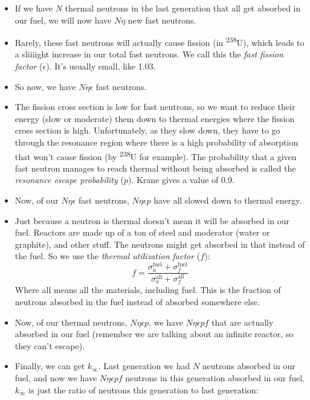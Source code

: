 \documentclass[letter]{article}
\begin{document}
\begin{itemize}
\item If we have $N$ thermal neutrons in the last generation that all get
  absorbed in our fuel, we will now have $N\eta$ new fast neutrons.
\item Rarely, these fast neutrons will actually cause fission (in
  \textsuperscript{238}U), which leads to a sliiiight increase in our
  total fast neutrons. We call this the \textit{fast fission factor}
  ($\epsilon$). It's usually small, like 1.03.~\cite[pp.502]{krane}
\item So now, we have $N\eta\epsilon$ fast neutrons.
\item The fission cross section is low for fast neutrons, so we want
  to reduce their energy (slow or moderate) them down to thermal
  energies where the fission cross section is high. Unfortunately, as
  they slow down, they have to go through the resonance region where
  there is a high probability of absorption that won't cause fission (by \textsuperscript{238}U
  for example). The probability that a
  given fast neutron manages to reach thermal without being absorbed
  is called the \textit{resonance escape probability}
  ($p$). Krane gives a value of 0.9.~\cite[pp. 503]{krane}
\item Now, of our $N\eta\epsilon$ fast neutrons, $N\eta\epsilon{}p$ have all slowed
  down to thermal energy.
\item Just because a neutron is thermal doesn't mean it will be
  absorbed in our fuel. Reactors are made up of a ton of steel and
  moderator (water or graphite), and other stuff. The neutrons might
  get absorbed in that instead of the fuel. So we use the
  \textit{thermal utilization factor} ($f$):
  \begin{equation*}
    f = \frac{\sigma_a^{\text{fuel}}+\sigma_f^{\text{fuel}}}{\sigma_a^{\text{all}}+\sigma_f^{\text{all}}}
  \end{equation*}
Where all means all the materials, including fuel. This is the
fraction of neutrons absorbed in the fuel instead of absorbed
somewhere else.~\cite[pp. 503]{krane}
\item Now, of our thermal neutrons, $N\eta\epsilon{}p$, we have
  $N\eta\epsilon{}pf$ that are actually absorbed in our fuel (remember
  we are talking about an infinite reactor, so they can't escape).
\item Finally, we can get $k_\infty$. Last generation we had $N$
  neutrons absorbed in our fuel, and now we have $N\eta\epsilon{}pf$
  neutrons in this generation absorbed in our fuel. $k_\infty$ is just
  the ratio of neutrons this generation to last generation:

\end{itemize}
\end{document}
